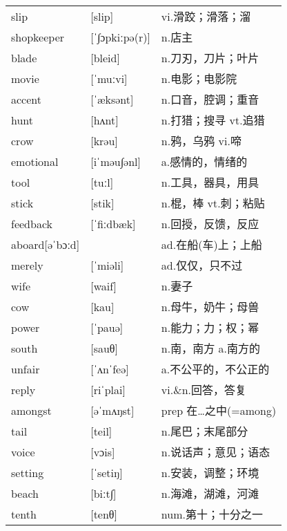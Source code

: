 \documentclass[a4paper]{article}
\begin{document}
\section{}
\begin{tabular}{l l l}

slip & [slip] & vi.滑跤；滑落；溜 \\
shopkeeper & [ˈ∫ɔpkiːpə(r)] & n.店主 \\
blade & [bleid] & n.刀刃，刀片；叶片 \\
movie & [ˈmuːvi] & n.电影；电影院 \\
accent & [ˈæksənt] & n.口音，腔调；重音 \\
hunt & [hʌnt] & n.打猎；搜寻 vt.追猎 \\
crow & [krəu] & n.鸦，乌鸦 vi.啼 \\
emotional & [iˈməu∫ənl] & a.感情的，情绪的 \\
tool & [tuːl] & n.工具，器具，用具 \\
stick & [stik] & n.棍，棒 vt.刺；粘贴 \\
feedback & [ˈfiːdbæk] & n.回授，反馈，反应 \\
aboard[əˈbɔːd] &  & ad.在船(车)上；上船 \\
merely & [ˈmiəli] & ad.仅仅，只不过 \\
wife & [waif] & n.妻子 \\
cow & [kau] & n.母牛，奶牛；母兽 \\
power & [ˈpauə] & n.能力；力；权；幂 \\
south & [sauθ] & n.南，南方 a.南方的 \\
unfair & [ˈʌnˈfeə] & a.不公平的，不公正的 \\
reply & [riˈplai] & vi.\&n.回答，答复 \\
amongst & [əˈmʌŋst] & prep 在…之中(=among) \\
tail & [teil] & n.尾巴；末尾部分 \\
voice & [vɔis] & n.说话声；意见；语态 \\
setting & [ˈsetiŋ] & n.安装，调整；环境 \\
beach & [biːt∫] & n.海滩，湖滩，河滩 \\
tenth & [tenθ] & num.第十；十分之一 \\

\end{tabular}
\end{document}
